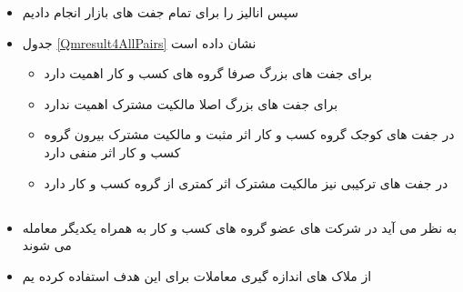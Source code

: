 \documentclass[12pt, a4paper]{article}
\begin{document}
\begin{itemize}
\begin{itemize}
	\end{itemize}
	\item
	سپس انالیز را برای تمام  جفت های بازار  انجام دادیم
	\item
	جدول  
	\ref{Qmresult4AllPairs}
	نشان داده است
	\begin{LTR}
	\end{LTR}
	\begin{itemize}
	\item 
	برای جفت های بزرگ صرفا گروه های کسب و کار اهمیت دارد 
	\item 
	برای جفت های بزرگ اصلا مالکیت مشترک اهمیت ندارد
	\item 
	در جفت های کوجک گروه کسب و کار اثر مثبت و مالکیت مشترک بیرون گروه کسب و کار اثر منفی دارد 
	\item
	در جفت های ترکیبی نیز مالکیت مشترک اثر کمتری از گروه کسب و کار دارد
	
\end{itemize}
\end{itemize}
		


	
	






\FloatBarrier

\subsection{ }
\begin{itemize}
	\item 
	به نظر می آید در شرکت های عضو گروه های کسب و کار به همراه یکدیگر معامله می شوند
	\item
	از ملاک های اندازه گیری معاملات برای این هدف استفاده کرده یم
\end{itemize}
\end{document}
